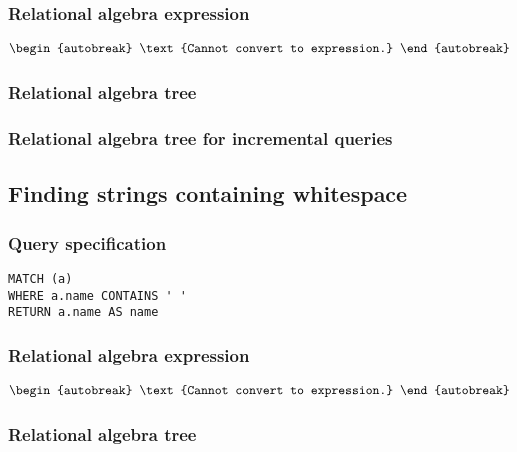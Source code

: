 \subsubsection*{Relational algebra expression}

\begin{align*}
\begin{autobreak}
\text{Cannot convert to expression.}
\end{autobreak}
\end{align*}

\subsubsection*{Relational algebra tree}


\subsubsection*{Relational algebra tree for incremental queries}


\subsection{Finding strings containing whitespace}

\subsubsection*{Query specification}

\begin{lstlisting}
MATCH (a)
WHERE a.name CONTAINS ' '
RETURN a.name AS name
\end{lstlisting}

\subsubsection*{Relational algebra expression}

\begin{align*}
\begin{autobreak}
\text{Cannot convert to expression.}
\end{autobreak}
\end{align*}

\subsubsection*{Relational algebra tree}

